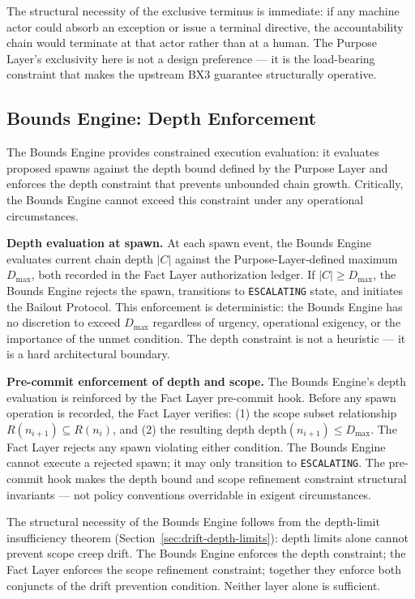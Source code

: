 The structural necessity of the exclusive terminus is immediate: if any machine actor could absorb an exception or issue a terminal directive, the accountability chain would terminate at that actor rather than at a human. The Purpose Layer's exclusivity here is not a design preference — it is the load-bearing constraint that makes the upstream BX3 guarantee structurally operative.

\subsection{Bounds Engine: Depth Enforcement}
\label{sec:rs-bounds-depth}

The Bounds Engine provides constrained execution evaluation: it evaluates proposed spawns against the depth bound defined by the Purpose Layer and enforces the depth constraint that prevents unbounded chain growth. Critically, the Bounds Engine cannot exceed this constraint under any operational circumstances.

\medskip
\noindent\textbf{Depth evaluation at spawn.} At each spawn event, the Bounds Engine evaluates current chain depth $|C|$ against the Purpose-Layer-defined maximum $D_{\mathrm{max}}$, both recorded in the Fact Layer authorization ledger. If $|C| \geq D_{\mathrm{max}}$, the Bounds Engine rejects the spawn, transitions to \texttt{ESCALATING} state, and initiates the Bailout Protocol. This enforcement is deterministic: the Bounds Engine has no discretion to exceed $D_{\mathrm{max}}$ regardless of urgency, operational exigency, or the importance of the unmet condition. The depth constraint is not a heuristic — it is a hard architectural boundary.

\medskip
\noindent\textbf{Pre-commit enforcement of depth and scope.} The Bounds Engine's depth evaluation is reinforced by the Fact Layer pre-commit hook. Before any spawn operation is recorded, the Fact Layer verifies: (1) the scope subset relationship $R(n_{i+1}) \subseteq R(n_i)$, and (2) the resulting depth $\mathrm{depth}(n_{i+1}) \leq D_{\mathrm{max}}$. The Fact Layer rejects any spawn violating either condition. The Bounds Engine cannot execute a rejected spawn; it may only transition to \texttt{ESCALATING}. The pre-commit hook makes the depth bound and scope refinement constraint structural invariants — not policy conventions overridable in exigent circumstances.

The structural necessity of the Bounds Engine follows from the depth-limit insufficiency theorem (Section~\ref{sec:drift-depth-limits}): depth limits alone cannot prevent scope creep drift. The Bounds Engine enforces the depth constraint; the Fact Layer enforces the scope refinement constraint; together they enforce both conjuncts of the drift prevention condition. Neither layer alone is sufficient.

